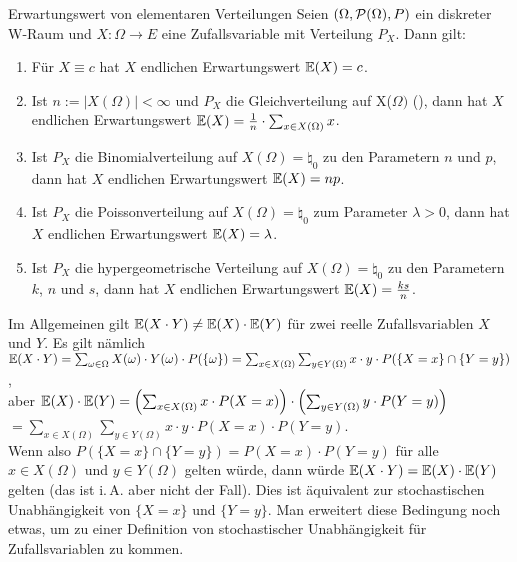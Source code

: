 \linie
\pagebreak

\begin{Satz}{Erwartungswert von elementaren Verteilungen}
    Seien $(\Omega, \P(\Omega), P)$ ein diskreter\\
    W-Raum und $X\colon \Omega \rightarrow E$ eine Zufallsvariable mit Verteilung $P_X$.
    Dann gilt:
    \begin{enumerate}
        \item
        Für $X \equiv c$ hat $X$ endlichen Erwartungswert $\EW(X) = c$.

        \item
        Ist $n := |X(\Omega)| < \infty$ und $P_X$ die Gleichverteilung auf X($\Omega)$
        (), dann hat $X$ endlichen Erwartungswert
        $\EW(X) = \frac{1}{n} \cdot \sum_{x \in X(\Omega)} x$.

        \item
        Ist $P_X$ die Binomialverteilung auf $X(\Omega) = \natural_0$
        zu den Parametern $n$ und $p$, dann hat $X$ endlichen Erwartungswert $\EW(X) = np$.

        \item
        Ist $P_X$ die Poissonverteilung auf $X(\Omega) = \natural_0$ zum Parameter $\lambda > 0$,
        dann hat $X$ endlichen Erwartungswert $\EW(X) = \lambda$.

        \item
        Ist $P_X$ die hypergeometrische Verteilung auf $X(\Omega) = \natural_0$ zu den Parametern
        $k$, $n$ und $s$, dann hat $X$ endlichen Erwartungswert $\EW(X) = \frac{ks}{n}$.
    \end{enumerate}
\end{Satz}

\linie

\begin{Bem}
    Im Allgemeinen gilt $\EW(X \cdot Y) \not= \EW(X) \cdot \EW(Y)$ für zwei reelle Zufallsvariablen
    $X$ und $Y$.
    Es gilt nämlich\\
    $\EW(X \cdot Y) =
    \sum_{\omega \in \Omega} X(\omega) \cdot Y(\omega) \cdot P(\{\omega\}) =
    \sum_{x \in X(\Omega)} \sum_{y \in Y(\Omega)} x \cdot y \cdot P(\{X = x\} \cap \{Y = y\})$,\\
    aber $\EW(X) \cdot \EW(Y) = \left(\sum_{x \in X(\Omega)} x \cdot P(X = x)\right) \cdot
    \left(\sum_{y \in Y(\Omega)} y \cdot P(Y = y)\right)$\\
    $= \sum_{x \in X(\Omega)} \sum_{y \in Y(\Omega)} x \cdot y \cdot P(X = x) \cdot P(Y = y)$.\\
    Wenn also $P(\{X = x\} \cap \{Y = y\}) = P(X = x) \cdot P(Y = y)$ für alle $x \in X(\Omega)$
    und $y \in Y(\Omega)$ gelten würde, dann würde $\EW(X \cdot Y) = \EW(X) \cdot \EW(Y)$ gelten
    (das ist i.\,A. aber nicht der Fall).
    Dies ist äquivalent zur stochastischen Unabhängigkeit von $\{X = x\}$ und $\{Y = y\}$.
    Man erweitert diese Bedingung noch etwas, um zu einer Definition von stochastischer
    Unabhängigkeit für Zufallsvariablen zu kommen.
\end{Bem}

